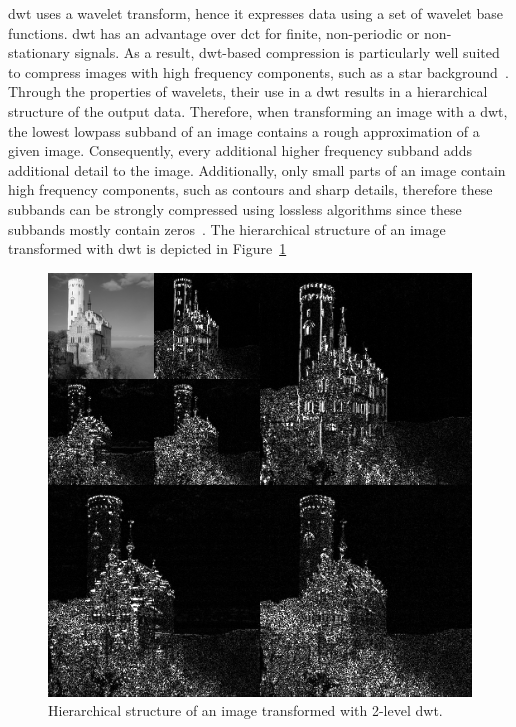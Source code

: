 \Gls{dwt} uses a wavelet transform, hence it expresses data using a set of wavelet base functions. \gls{dwt} has an advantage over \gls{dct} for finite, non-periodic or non-stationary signals. As a result, \gls{dwt}-based compression is particularly well suited to compress images with high frequency components, such as a star background~\cite{Bocharova2009CompressionMultimedia}. Through the properties of wavelets, their use in a \gls{dwt} results in a hierarchical structure of the output data. Therefore, when transforming an image with a \gls{dwt}, the lowest lowpass subband of an image contains a rough approximation of a given image. Consequently, every additional higher frequency subband adds additional detail to the image. Additionally, only small parts of an image contain high frequency components, such as contours and sharp details, therefore these subbands can be strongly compressed using lossless algorithms since these subbands mostly contain zeros~\cite{Bocharova2009CompressionMultimedia}. The hierarchical structure of an image transformed with \gls{dwt} is depicted in Figure~\ref{fig:jp2_hierarchy}
\begin{figure}[htb]
    \centering
        \includegraphics[width=.7\textwidth]{doc/thesis/0_figures/jp2_jpeg/Jpeg2000_2-level_wavelet_transform-lichtenstein.png}
        \caption{Hierarchical structure of an image transformed with 2-level \gls{dwt}.}
        \label{fig:jp2_hierarchy}
\end{figure}

